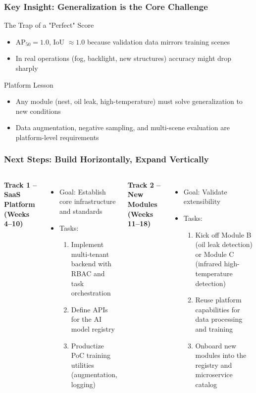 \documentclass[aspectratio=169]{beamer}
\begin{document}
\begin{frame}
\frametitle{Key Insight: Generalization is the Core Challenge}
\vspace{-5pt}
\begin{block}{The Trap of a "Perfect" Score}
\begin{itemize}
  \item AP$_{50}=1.0$, IoU $\approx 1.0$ because validation data mirrors training scenes
  \item In real operations (fog, backlight, new structures) accuracy might drop sharply
\end{itemize}
\end{block}
\begin{block}{Platform Lesson}
\begin{itemize}
  \item Any module (nest, oil leak, high-temperature) must solve generalization to new conditions
  \item Data augmentation, negative sampling, and multi-scene evaluation are platform-level requirements
\end{itemize}
\end{block}
\end{frame}

\begin{frame}
\frametitle{Next Steps: Build Horizontally, Expand Vertically}
\vspace{-5pt}
\begin{columns}
\textbf{Track 1 -- SaaS Platform (Weeks 4--10)}
\begin{itemize}
  \item Goal: Establish core infrastructure and standards
  \item Tasks:
    \begin{enumerate}
      \item Implement multi-tenant backend with RBAC and task orchestration
      \item Define APIs for the AI model registry
      \item Productize PoC training utilities (augmentation, logging)
    \end{enumerate}
\end{itemize}

\textbf{Track 2 -- New Modules (Weeks 11--18)}
\begin{itemize}
  \item Goal: Validate extensibility
  \item Tasks:
    \begin{enumerate}
      \item Kick off Module B (oil leak detection) or Module C (infrared high-temperature detection)
      \item Reuse platform capabilities for data processing and training
      \item Onboard new modules into the registry and microservice catalog
    \end{enumerate}
\end{itemize}
\end{columns}
\end{frame}
\end{document}

